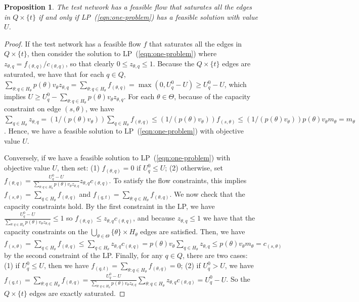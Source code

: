 \documentclass{article}
\newtheorem{proposition}{Proposition}
\begin{document}
\begin{proposition}
The test network has a feasible flow that  saturates all the edges in $Q
\times \{t\}$ if and only if LP~(\ref{eqn:one-problem}) has a feasible
solution with value $U$.
\label{prop:network}
\end{proposition}
\begin{proof}
  If the test network has a feasible flow $f$ that saturates all the edges
  in $Q \times \{t\}$, then consider the solution to
  LP~(\ref{eqn:one-problem}) where $z_{\theta, q} = f_{(\theta, q)} /
  c_{(\theta, q)}$, so that clearly $0 \leq z_{\theta, q} \leq 1$.
 Because the $Q \times \{t\}$ edges are saturated, we
  have that for each $q \in Q$, $\sum_{\theta:q \in H_\theta}
  p(\theta)v_\theta z_{\theta,q} = \sum_{\theta:q \in H_\theta} f_{(\theta,
    q)} = \max(0, U_q^0-U) \geq U_q^0-U$, which implies $U \geq U_q^0 -
  \sum_{\theta:q \in H_\theta} p(\theta)v_\theta z_{\theta,q}$.  For each
  $\theta \in \Theta$, because of the capacity constraint on edge $(s,
  \theta)$, we have $\sum_{q \in H_\theta} z_{\theta,q} = (1/(p(\theta)
  v_\theta)) \sum_{q \in H_\theta} f_{(\theta, q)} \leq (1/(p(\theta)
  v_\theta)) f_{(s,\theta)} \leq (1/(p(\theta) v_\theta)) p(\theta) v_\theta
  m_\theta = m_\theta$.  Hence, we have a feasible solution to
  LP~(\ref{eqn:one-problem}) with objective value $U$.

  Conversely, if we have a feasible solution to LP~(\ref{eqn:one-problem})
  with objective value $U$, then set: (1) $f_{(\theta,q)} = 0$ if $U_q^0 \leq
  U$; (2) otherwise, set $f_{(\theta,q)} = \frac{U_q^0-U}{\sum_{\theta:q \in
      H_\theta} p(\theta)v_\theta z_{\theta,q}} z_{\theta,q} c_{(\theta,
    q)}$.  To satisfy the flow constraints, this implies $f_{(s,\theta)} =
  \sum_{q \in H_\theta} f_{(\theta,q)}$ and $f_{(q,t)} = \sum_{\theta: q \in
    H_\theta} f_{(\theta,q)}$.  We now check that the capacity constraints
  hold. By the first constraint in the LP, we have
  $\frac{U_q^0-U}{\sum_{\theta:q \in H_\theta} p(\theta)v_\theta z_{\theta,q}}
\leq 1$ so $f_{(\theta,q)}
    \leq z_{\theta,q} c_{(\theta, q)}$, and because $z_{\theta,q} \leq 1$
    we have that the capacity constraints on the  $\bigcup_{\theta \in \Theta} \{\theta\} \times
H_\theta$ edges
 are satisfied.  Then, we have $f_{(s,\theta)} = \sum_{q \in
      H_\theta} f_{(\theta,q)} \leq \sum_{q \in
      H_\theta} z_{\theta,q} c_{(\theta, q)} = 
p(\theta) v_\theta \sum_{q \in
      H_\theta} z_{\theta,q}  \leq p(\theta) v_\theta m_\theta =
    c_{(s,\theta)}$ by the second constraint of the LP. 
  Finally, for any $q \in Q$, there are two cases: (1) if $U_q^0 \leq U$,
  then we have $f_{(q,t)} = \sum_{\theta: q \in H_\theta} f_{(\theta,q)} = 0$;
  (2) if $U_q^0 > U$, we have $f_{(q,t)} = \sum_{\theta: q \in H_\theta}
  f_{(\theta,q)} = \frac{U_q^0-U}{\sum_{\theta:q \in H_\theta}
    p(\theta)v_\theta z_{\theta,q}} \sum_{\theta: q \in H_\theta}
  z_{\theta,q} c_{(\theta, q)} = U_q^0-U$.  So the $Q \times \{t\}$ edges
  are exactly saturated.
\end{proof}
\end{document}
